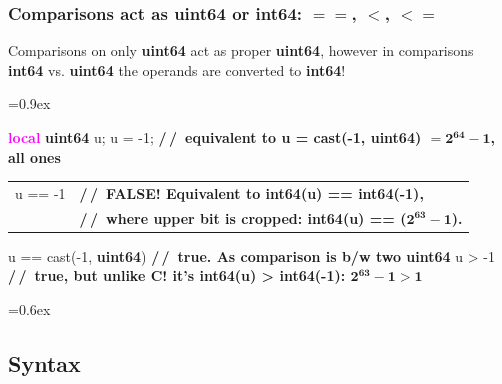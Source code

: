 \documentclass[8pt]{extarticle}
\newenvironment{code}[1][]{%
\begin{prebox}[#1]\obeylines%
\fontdimen2\font=0.9ex%
}{%
\end{prebox}%
\fontdimen2\font=0.6ex%
}
\newcommand{\ind}{\hphantom{~~~}}
\newcommand{\kw}[1]{\textcolor{magenta}{\textbf{#1}}}
\newcommand{\ty}[1]{\textcolor{myOrange}{\textbf{#1}}}
\newcommand{\cmtcommon}[1]{\textcolor{Sepia}{\textbf{#1}}}
\newcommand{\cmtd}[1]{\cmtcommon{/\,/\ #1}}
\newcommand{\local}{\kw{local} }
\begin{document}
\begin{multicols*}{3}
\subsubsection{Comparisons act as uint64 or int64: $==$, $<$, $<=$}
        Comparisons on only \ty{uint64} act as proper \ty{uint64}, however
        in comparisons \ty{int64} vs. \ty{uint64} the operands are converted to \ty{int64}!

        \begin{code}
            \local \ty{uint64} u;
            u = -1; \ind \cmtd{equivalent to u = cast(-1, uint64) $\mathbf{= 2^{64}-1}$, all ones}
            \noindent\begin{tabular}{@{}ll}
                u == -1 & \cmtd{FALSE! Equivalent to int64(u) == int64(-1),} \\
                        & \cmtd{where upper bit is cropped: int64(u) == ($\mathbf{2^{63}-1}$).}
            \end{tabular}
            u == cast(-1, \ty{uint64}) \cmtd{true. As comparison is b/w two uint64}
            u > -1 \ind \cmtd{true, but unlike C! it's int64(u) > int64(-1): $\mathbf{2^{63}-1>1}$}
        \end{code}

\subsection{Syntax}


\end{multicols*}
\end{document}
